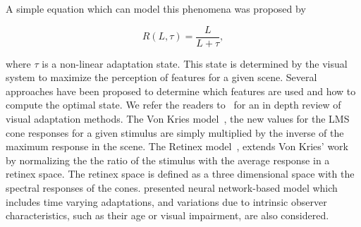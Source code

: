 A simple equation which can model this phenomena was proposed by~\cite{Naka:1966}

\begin{equation}
\label{eq:visual_adaptation}
R(L, \tau) = \frac{L}{L + \tau},
\end{equation}

where $\tau$ is a non-linear adaptation state.
This state is determined by the visual system to maximize the perception of features for a given scene.
Several approaches have been proposed to determine which features are used and how to compute the optimal state.
We refer the readers to~\cite{Fairchild:2005} for an in depth review of visual adaptation methods.
The Von Kries model~\cite{Fairchild:2005}, the new values for the LMS cone responses for a given stimulus are simply multiplied by the inverse of the maximum response in the scene.
The Retinex model~\cite{Fairchild:2005}, extends Von Kries' work by normalizing the the ratio of the stimulus with the average response in a retinex space.
The retinex space is defined as a three dimensional space with the spectral responses of the cones.
\cite{Irawan:2005} presented neural network-based model which includes time varying adaptations, and variations due to intrinsic observer characteristics, such as their age or visual impairment, are also considered.
